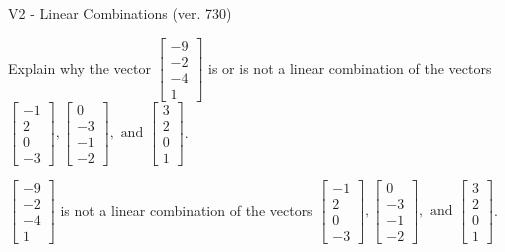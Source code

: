 \begin{exercise}
  \begin{exerciseTitle}V2 - Linear Combinations (ver. 730)\end{exerciseTitle}
  \begin{exerciseStatement}
    Explain why the vector \(\left[\begin{array}{c}
-9 \\
-2 \\
-4 \\
1
\end{array}\right]\)  is or is not a linear 
	combination of the vectors \(\left[\begin{array}{c}
-1 \\
2 \\
0 \\
-3
\end{array}\right] , \left[\begin{array}{c}
0 \\
-3 \\
-1 \\
-2
\end{array}\right] , \text{ and } \left[\begin{array}{c}
3 \\
2 \\
0 \\
1
\end{array}\right]\).
	


  \end{exerciseStatement}
  \begin{exerciseAnswer}
   \(\left[\begin{array}{c}
-9 \\
-2 \\
-4 \\
1
\end{array}\right]\) 
  	 is not  
	a linear combination of the vectors \(\left[\begin{array}{c}
-1 \\
2 \\
0 \\
-3
\end{array}\right] , \left[\begin{array}{c}
0 \\
-3 \\
-1 \\
-2
\end{array}\right] , \text{ and } \left[\begin{array}{c}
3 \\
2 \\
0 \\
1
\end{array}\right]\).

	
  


  \end{exerciseAnswer}
\end{exercise}